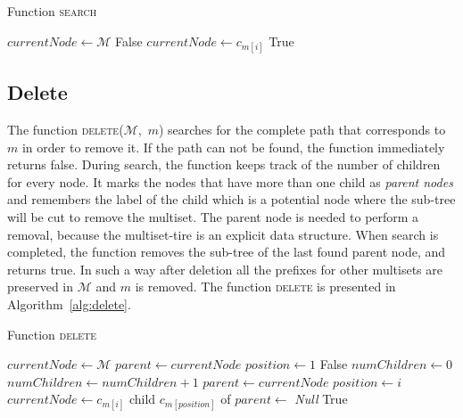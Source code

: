 \begin{algorithm}[h!]
\caption{Function \textsc{search}}
\label{alg:search}
\begin{algorithmic}[1]
\State $currentNode \gets \mathcal{M}$
\State \Return False
\EndIf
\State $currentNode \gets c_{m[i]}$
\EndFor
\State \Return True
\EndFunction
\end{algorithmic}
\end{algorithm}

\subsection{Delete} \label{s:delete}
The function \textsc{delete}($\mathcal{M},$ $m$) searches for the complete path 
that corresponds to $m$ in order to remove it. If the path can not be found, the 
function immediately returns false. During search, the function keeps track of the 
number of children for every node. It marks the nodes that have more than one child 
as \emph{parent nodes} and remembers the label of the child which is a potential node 
where the sub-tree will be cut to remove the multiset. The parent node is needed to 
perform a removal, because the multiset-tire is an explicit data structure. When search 
is completed, the function removes the sub-tree of the last found parent node, and 
returns true. In such a way after deletion all the prefixes for other multisets are 
preserved in $\mathcal{M}$ and $m$ is removed. The function \textsc{delete} is 
presented in Algorithm~\ref{alg:delete}.


\begin{algorithm}[h!]
\caption{Function \textsc{delete}}
\label{alg:delete}
\begin{algorithmic}[1]
\State $currentNode \gets \mathcal{M}$
\State $parent \gets currentNode$ 
\State $position \gets 1$
\State \Return False
\EndIf
\State $numChildren \gets 0$
\State $numChildren\gets numChildren+1$
\EndIf
\EndFor
{}
\State $parent\gets currentNode$
\State $position \gets i$
\EndIf
\State $currentNode \gets c_{m[i]}$
\EndFor
\State child $c_{m[position]}$ of $parent\gets$ \emph{Null}
\State \Return True
\EndFunction
\end{algorithmic}
\end{algorithm}

